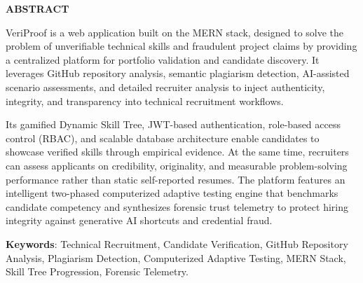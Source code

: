 \begin{center}
\vspace*{-0.2cm}
{\fontsize{18pt}{22pt}\selectfont \textbf{ABSTRACT}}
\end{center}

\vspace{0.6cm}
\noindent
VeriProof is a web application built on the MERN stack, designed to solve the problem of unverifiable technical skills and fraudulent project claims by providing a centralized platform for portfolio validation and candidate discovery. It leverages GitHub repository analysis, semantic plagiarism detection, AI-assisted scenario assessments, and detailed recruiter analysis to inject authenticity, integrity, and transparency into technical recruitment workflows.

\vspace{0.45cm}
\noindent
Its gamified Dynamic Skill Tree, JWT-based authentication, role-based access control (RBAC), and scalable database architecture enable candidates to showcase verified skills through empirical evidence. At the same time, recruiters can assess applicants on credibility, originality, and measurable problem-solving performance rather than static self-reported resumes. The platform features an intelligent two-phased computerized adaptive testing engine that benchmarks candidate competency and synthesizes forensic trust telemetry to protect hiring integrity against generative AI shortcuts and credential fraud.

\vspace{0.6cm}
\noindent
\textbf{Keywords}: Technical Recruitment, Candidate Verification, GitHub Repository Analysis, Plagiarism Detection, Computerized Adaptive Testing, MERN Stack, Skill Tree Progression, Forensic Telemetry.